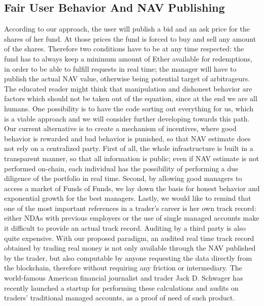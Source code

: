 \documentclass[9pt,oneside]{amsart}
\begin{document}
\begin{multicols}{2}
\subsection{Fair User Behavior And NAV Publishing}
According to our approach, the user will publish a bid and an ask price for the shares of her fund. At those prices the fund is forced to buy and sell any amount of the shares. Therefore two conditions have to be at any time respected: the fund has to always keep a minimum amount of Ether available for redemptions, in order to be able to fulfill requests in real time; the manager will have to publish the actual NAV value, otherwise being potential target of arbitrageurs.
The educated reader might think that manipulation and dishonest behavior are factors which should not be taken out of the equation, since at the end we are all humans. One possibility is to have the code sorting out everything for us, which is a viable approach and we will consider further developing towards this path. Our current alternative is to create a mechanism of incentives, where good behavior is rewarded and bad behavior is punished, so that NAV estimate does not rely on a centralized party. First of all, the whole infrastructure is built in a transparent manner, so that all information is public; even if NAV estimate is not performed on-chain, each individual has the possibility of performing a due diligence of the portfolio in real time. Second, by allowing good managers to access a market of Funds of Funds, we lay down the basis for honest behavior and exponential growth for the best managers.
Lastly, we would like to remind that one of the most important references in a trader's career is her own track record: either NDAs with previous employers or the use of single managed accounts make it difficult to provide an actual track record. Auditing by a third party is also quite expensive. With our proposed paradigm, an audited real time track record obtained by trading real money is not only available through the NAV published by the trader, but also computable by anyone requesting the data directly from the blockchain, therefore without requiring any friction or intermediary. The world-famous American financial journalist and trader Jack D. Schwager has recently launched a startup for performing these calculations and audits on traders' traditional managed accounts, as a proof of need of such product.


\end{multicols}
\end{document}

